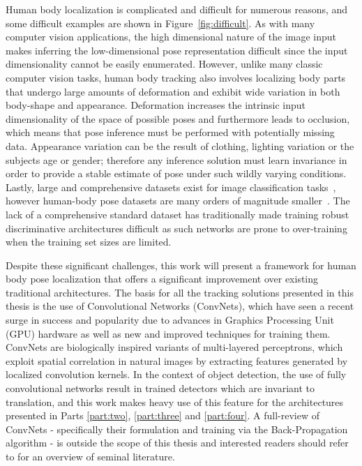 Human body localization is complicated and difficult for numerous reasons, and some difficult examples are shown in Figure~\ref{fig:difficult}. As with many computer vision applications, the high dimensional nature of the image input makes inferring the low-dimensional pose representation difficult since the input dimensionality cannot be easily enumerated. However, unlike many classic computer vision tasks, human body tracking also involves localizing body parts that undergo large amounts of deformation and exhibit wide variation in both body-shape and appearance. Deformation increases the intrinsic input dimensionality of the space of possible poses and furthermore leads to occlusion, which means that pose inference must be performed with potentially missing data. Appearance variation can be the result of clothing, lighting variation or the subjects age or gender; therefore any inference solution must learn invariance in order to provide a stable estimate of pose under such wildly varying conditions. Lastly, large and comprehensive datasets exist for image classification tasks~\cite{deng2009imagenet}, however human-body pose datasets are many orders of magnitude smaller~\cite{modec,andriluka14cvpr,Johnson10}. The lack of a comprehensive standard dataset has traditionally made training robust discriminative architectures difficult as such networks are prone to over-training when the training set sizes are limited.

Despite these significant challenges, this work will present a framework for human body pose localization that offers a significant improvement over existing traditional architectures. The basis for all the tracking solutions presented in this thesis is the use of Convolutional Networks (ConvNets), which have seen a recent surge in success and popularity due to advances in Graphics Processing Unit (GPU) hardware as well as new and improved techniques for training them. ConvNets are biologically inspired variants of multi-layered perceptrons, which exploit spatial correlation in natural images by extracting features generated by localized convolution kernels. In the context of object detection, the use of fully convolutional networks result in trained detectors which are invariant to translation, and this work makes heavy use of this feature for the architectures presented in Parts \ref{part:two}, \ref{part:three} and \ref{part:four}. A full-review of ConvNets - specifically their formulation and training via the Back-Propagation algorithm - is outside the scope of this thesis and interested readers should refer to \cite{reading_list} for an overview of seminal literature.

